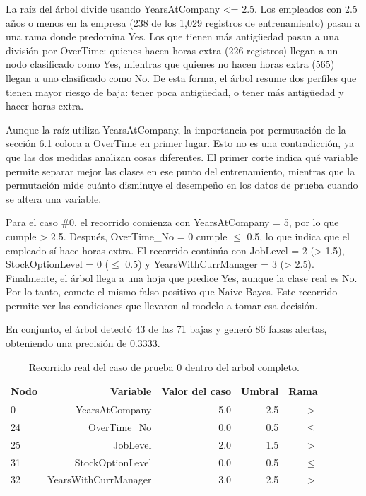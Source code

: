 \documentclass[letterpaper,11pt]{article}
\begin{document}
La raíz del árbol divide usando YearsAtCompany <= 2.5. Los empleados con 2.5 años o menos en la empresa (238 de los 1,029 registros de entrenamiento) pasan a una rama donde predomina Yes. Los que tienen más antigüedad pasan a una división por OverTime: quienes hacen horas extra (226 registros) llegan a un nodo clasificado como Yes, mientras que quienes no hacen horas extra (565) llegan a uno clasificado como No. De esta forma, el árbol resume dos perfiles que tienen mayor riesgo de baja: tener poca antigüedad, o tener más antigüedad y hacer horas extra.

Aunque la raíz utiliza YearsAtCompany, la importancia por permutación de la sección 6.1 coloca a OverTime en primer lugar. Esto no es una contradicción, ya que las dos medidas analizan cosas diferentes. El primer corte indica qué variable permite separar mejor las clases en ese punto del entrenamiento, mientras que la permutación mide cuánto disminuye el desempeño en los datos de prueba cuando se altera una variable.

Para el caso \#0, el recorrido comienza con YearsAtCompany = 5, por lo que cumple > 2.5. Después, OverTime\_No = 0 cumple \ensuremath{\leq} 0.5, lo que indica que el empleado sí hace horas extra. El recorrido continúa con JobLevel = 2 (> 1.5), StockOptionLevel = 0 (\ensuremath{\leq} 0.5) y YearsWithCurrManager = 3 (> 2.5). Finalmente, el árbol llega a una hoja que predice Yes, aunque la clase real es No. Por lo tanto, comete el mismo falso positivo que Naive Bayes. Este recorrido permite ver las condiciones que llevaron al modelo a tomar esa decisión.

En conjunto, el árbol detectó 43 de las 71 bajas y generó 86 falsas alertas, obteniendo una precisión de 0.3333.

\begin{table}[H]
\centering
\footnotesize
\setlength{\tabcolsep}{5pt}
\caption{Recorrido real del caso de prueba 0 dentro del arbol completo.}
\label{tab:ruta}
\begin{tabular}{lrrrr}
\toprule
Nodo & Variable & Valor del caso & Umbral & Rama \\
\midrule
0 & YearsAtCompany & 5.0 & 2.5 & $>$ \\
24 & OverTime\_No & 0.0 & 0.5 & $\leq$ \\
25 & JobLevel & 2.0 & 1.5 & $>$ \\
31 & StockOptionLevel & 0.0 & 0.5 & $\leq$ \\
32 & YearsWithCurrManager & 3.0 & 2.5 & $>$ \\
\bottomrule
\end{tabular}
\end{table}
\end{document}

